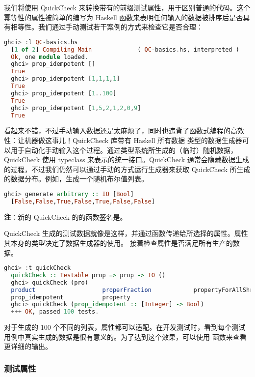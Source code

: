 \documentclass[./main.tex]{subfiles}
\begin{document}
我们将使用 QuickCheck 来转换带有的前缀测试属性，用于区别普通的代码。这个幂等性的属性被简单的编写为 Haskell
函数来表明任何输入的数据被排序后是否具有相等性。我们通过手动测试若干案例的方式来检查它是否合理：

\begin{lstlisting}[language=Haskell]
  ghci> :l QC-basics.hs
  [1 of 2] Compiling Main             ( QC-basics.hs, interpreted )
  Ok, one module loaded.
  ghci> prop_idempotent []
  True
  ghci> prop_idempotent [1,1,1,1]
  True
  ghci> prop_idempotent [1..100]
  True
  ghci> prop_idempotent [1,5,2,1,2,0,9]
  True
\end{lstlisting}

看起来不错，不过手动输入数据还是太麻烦了，同时也违背了函数式编程的高效性：让机器做这事儿！QuickCheck 库带有 Haskell 所有数据
类型的数据生成器可以用于自动化手动输入这个过程。通过类型系统所生成的（临时）随机数据，QuickCheck 使用
typeclass 来表示的统一接口。QuickCheck 通常会隐藏数据生成的过程，不过我们仍然可以通过手动的方式运行生成器来获取 QuickCheck
所生成的数据分布。例如，生成一个随机布尔值列表。

\begin{lstlisting}[language=Haskell]
  ghci> generate arbitrary :: IO [Bool]
  [False,False,True,False,True,False,False]
\end{lstlisting}

\textbf{注}：新的 QuickCheck 的的函数签名是。

QuickCheck 生成的测试数据就像是这样，并通过函数传递给所选择的属性。属性其本身的类型决定了数据生成器的使用。
接着检查属性是否满足所有生产的数据。

\begin{lstlisting}[language=Haskell]
  ghci> :t quickCheck
  quickCheck :: Testable prop => prop -> IO ()
  ghci> quickCheck (pro)
  product                   properFraction            propertyForAllShrinkShow
  prop_idempotent           property
  ghci> quickCheck (prop_idempotent :: [Integer] -> Bool)
  +++ OK, passed 100 tests.
\end{lstlisting}

对于生成的 100 个不同的列表，属性都可以适配。在开发测试时，看到每个测试用例中真实生成的数据是很有意义的。为了达到这个效果，可以使用
函数来查看更详细的输出。

\subsubsection*{测试属性}
\end{document}
